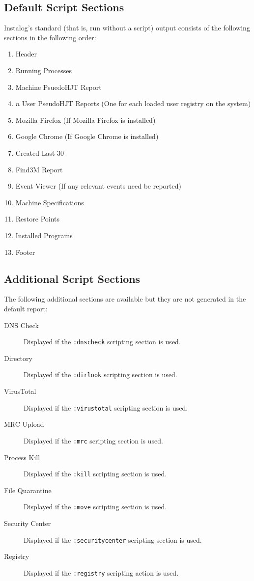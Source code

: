 \subsection{Default Script Sections} \label{sec:default_script_sections}
Instalog's standard (that is, run without a script) output consists of the
following sections in the following order:
\begin{enumerate}
    \item Header
    \item Running Processes
    \item Machine PsuedoHJT Report
    \item $n$ User PseudoHJT Reports (One for each loaded user registry on the
    system)
    \item Mozilla Firefox (If Mozilla Firefox is installed)
    \item Google Chrome (If Google Chrome is installed)
    \item Created Last 30
    \item Find3M Report
    \item Event Viewer (If any relevant events need be reported)
    \item Machine Specifications
    \item Restore Points
    \item Installed Programs
    \item Footer
\end{enumerate}

\subsection{Additional Script Sections}
The following additional sections are available but they are not
generated in the default report:
\begin{description}
\item[DNS Check] Displayed if the \verb|:dnscheck| scripting section is used.
\item[Directory] Displayed if the \verb|:dirlook| scripting section is used.
\item[VirusTotal] Displayed if the \verb|:virustotal| scripting section is used.
\item[MRC Upload] Displayed if the \verb|:mrc| scripting section is used.
\item[Process Kill] Displayed if the \verb|:kill| scripting section is used.
\item[File Quarantine] Displayed if the \verb|:move| scripting section is used.
\item[Security Center] Displayed if the \verb|:securitycenter| scripting section
is used.
\item[Registry] Displayed if the \verb|:registry| scripting action is used.
\end{description}
